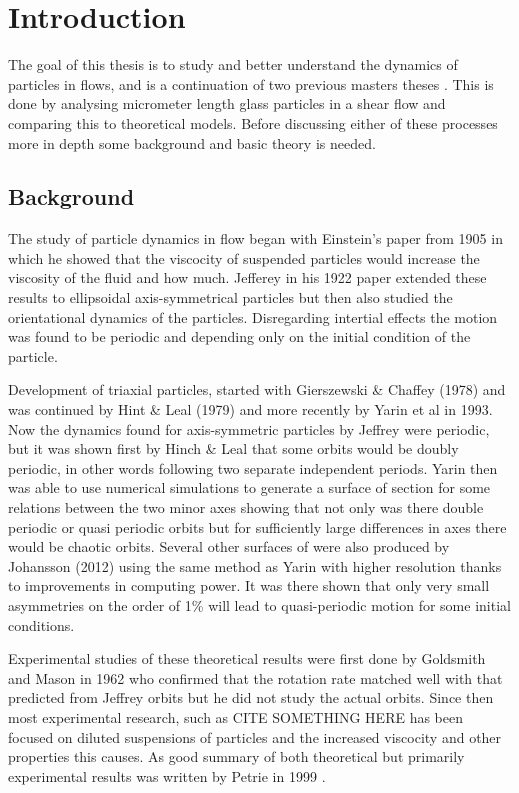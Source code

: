 \section{Introduction}
The goal of this thesis is to study and better understand the dynamics of particles in flows, and is a continuation of two previous masters theses \cite{AntonThesis}\cite{JonasThesis}. This is done by analysing micrometer length glass particles in a shear flow and comparing this to theoretical models. Before discussing either of these processes more in depth some background and basic theory is needed.

\subsection{Background}
The study of particle dynamics in flow began with Einstein's paper from 1905 \cite{Einstein} in which he showed that the viscocity of suspended particles would increase the viscosity of the fluid and how much. Jefferey in his 1922 paper \cite{Jeffrey} extended these results to ellipsoidal axis-symmetrical particles but then also studied the orientational dynamics of the particles. Disregarding intertial effects the motion was found to be periodic and depending only on the initial condition of the particle.

Development of triaxial particles, started with Gierszewski \& Chaffey (1978)\cite{Chaffey} and was continued by Hint \& Leal (1979) and more recently by Yarin et al in 1993\cite{Yarin}. 
Now the dynamics found for axis-symmetric particles by Jeffrey were periodic, but it was shown first by Hinch \& Leal that some orbits would be doubly periodic, in other words following two separate independent periods. 
Yarin then was able to use numerical simulations to generate a surface of section \cite{SurfaceOfSection} for some relations between the two minor axes showing that not only was there double periodic or quasi periodic orbits but for sufficiently large differences in axes there would be chaotic orbits. 
Several other surfaces of were also produced by Johansson (2012)\cite{AntonThesis} using the same method as Yarin with higher resolution thanks to improvements in computing power. It was there shown that only very small asymmetries on the order of 1\% will lead to quasi-periodic motion for some initial conditions.

Experimental studies of these theoretical results were first done by Goldsmith and Mason in 1962\cite{Mason} who confirmed that the rotation rate matched well with that predicted from Jeffrey orbits but he did not study the actual orbits. Since then most experimental research, such as CITE SOMETHING HERE has been focused on diluted suspensions of particles and the increased viscocity and other properties this causes. As good summary of both theoretical but primarily experimental results was written by Petrie in 1999 \cite{Petrie}.

